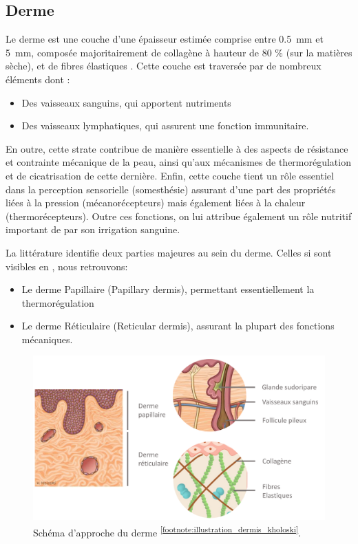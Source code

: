 \subsection{Derme}
Le derme est une couche d’une épaisseur estimée comprise entre \SI{0,5}{\milli\metre} et \SI{5}{\milli\metre}, composée majoritairement de collagène à hauteur de 80 \% (sur la matières sèche), et de fibres élastiques \cite{McGrath2010}. Cette couche est traversée par de nombreux éléments dont : 

\begin{itemize}
\item Des vaisseaux sanguins, qui apportent nutriments
\item Des vaisseaux lymphatiques, qui assurent une fonction immunitaire.
\end{itemize}\par

En outre, cette strate contribue de manière essentielle à des aspects de résistance et contrainte mécanique de la peau, ainsi qu’aux mécanismes de thermorégulation et de cicatrisation de cette dernière. Enfin, cette couche tient un rôle essentiel dans la perception sensorielle (somesthésie) assurant d’une part des propriétés liées à la pression (mécanorécepteurs) mais également liées à la chaleur (thermorécepteurs). Outre ces fonctions, on lui attribue également un rôle nutritif important de par son irrigation sanguine.\par
La littérature identifie deux parties majeures au sein du derme. Celles si sont visibles en , nous retrouvons:
\begin{itemize}
\item Le derme Papillaire (Papillary dermis), permettant essentiellement la thermorégulation
\item Le derme Réticulaire (Reticular dermis), assurant la plupart des fonctions mécaniques.
\end{itemize}\par

\begin{figure}[H]
    \centering
    \includegraphics[width=\linewidth]{contents/chapter_1/resources/illustration_dermis_kholoski.pdf}
    \caption{Schéma d’approche du derme \textsuperscript{\ref{footnote:illustration_dermis_kholoski}}.}
    \label{fig:illustration_dermis_kholoski}
\end{figure}\par

